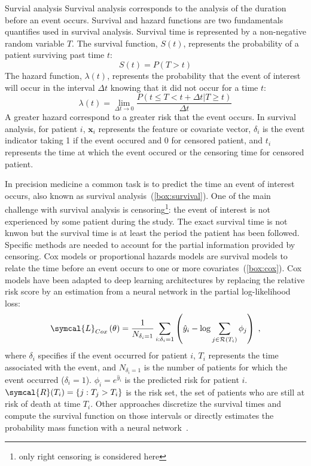 \documentclass[../main.tex]{subfiles}
\begin{document}
		\begin{mybox}[label={box:survival}]{Survial analysis}
			Survival analysis corresponds to the analysis of the duration before an event occurs. 
			Survival and hazard functions are two fundamentals quantifies used in survival analysis.
			Survival time is represented by a non-negative random variable \(T\). 
			The survival function, \(S(t)\), represents the probability of a patient surviving past time \(t\):
			\[S(t) = P(T > t)\]
			The hazard function, \(\lambda(t)\), represents the probability that the event of interest will occur in the interval \(\Delta t\) knowing that it did not occur for a time \(t\):
			\[\lambda(t) = \lim_{\Delta t \to 0} \frac{P(t \leq T < t + \Delta t | T \geq t)}{\Delta t}\]
			A greater hazard correspond to a greater risk that the event occurs. 
			In survival analysis, for patient \(i\), \(\symbf{x}_{i}\) represents the feature or covariate vector, \(\delta_{i}\) is the event indicator taking 1 if the event occured and 0 for censored patient, and \(t_{i}\) represents the time at which the event occured or the censoring time for censored patient. 
		\end{mybox}

		In precision medicine a common task is to predict the time an event of interest occurs, also known as survival analysis~(\cref{box:survival}). 
		One of the main challenge with survival analysis is censoring\footnote{only right censoring is considered here}: the event of interest is not experienced by some patient during the study. 
		The exact survival time is not knwon but the survival time is at least the period the patient has been followed.
		Specific methods are needed to account for the partial information provided by censoring. 
		Cox models or proportional hazards models are survival models to relate the time before an event occurs to one or more covariates~(\cref{box:cox}). 
		Cox models have been adapted to deep learning architectures by replacing the relative risk score by an estimation from a neural network in the partial log-likelihood loss:
		\begin{equation}
			\symcal{L}_{Cox}\left(\theta\right) = \frac{1}{N_{\delta_i = 1}} \sum_{i:\delta_i=1} \left(\hat{y}_i - \log \sum_{j \in \mathcal{R}(T_i)}\phi_j \right)\; \text{,} \label{eq:cox_loss}
		\end{equation}
		where \(\delta_i\) specifies if the event occurred for patient \(i\), \(T_i\) represents the time associated with the event, and \(N_{\delta_i = 1}\) is the number of patients for which the event occurred (\(\delta_i = 1\)).
		\(\phi_i = e^{\hat{y}_i}\) is the predicted risk for patient \(i\).
		\(\symcal{R}(T_i) = \{j: T_j > T_i\}\) is the risk set, the set of patients who are still at risk of death at time \(T_i\).
		Other approaches discretize the survival times and compute the survival function on those intervals or directly estimates the probability mass function with a neural network~\cite{Lee2018}.
\end{document}
